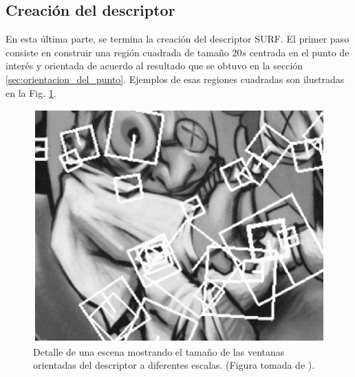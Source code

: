    \subsection{Creación del descriptor}
      En esta última parte, se termina la creación del descriptor SURF.
      El primer paso consiste en construir una región cuadrada de tamaño $20s$ centrada en el punto de interés y orientada de acuerdo al resultado que se obtuvo en la sección \ref{sec:orientacion_del_punto}. Ejemplos de esas regiones cuadradas son ilustradas en la Fig. \ref{fig:squareregionsexample}.
      \begin{figure}[tbhp]
	\centering
	      \includegraphics[scale=0.4]{./figs/squareregionsexample}
	  \caption[Ejemplo de ventanas del descriptor a diferentes escalas sobre una imagen]{Detalle de una escena mostrando el tamaño de las ventanas orientadas del descriptor a diferentes escalas. (Figura tomada de \cite{Bay:2008:SRF}).}
	\label{fig:squareregionsexample}                %
      \end{figure}
